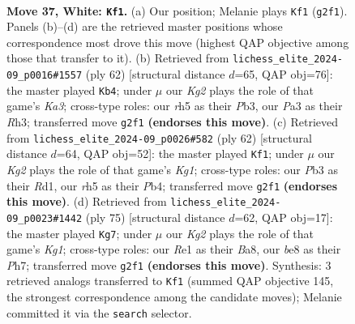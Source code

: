 \documentclass[11pt]{article}
\begin{document}
\begin{figure}[p]\centering
\begin{subfigure}{0.46\textwidth}\centering
\resizebox{\linewidth}{!}{%
\newchessgame
\chessboard[
  setfen={r3b1k1/p4pP1/8/p6r/4p1q1/PP6/1Q3PK1/3RR3 w - - 4 37},
  showmover=false,
  pgfstyle=straightmove, color=movearrow, markmove={g2-f1}
]}
\caption{}
\end{subfigure}\hfill
\begin{subfigure}{0.46\textwidth}\centering
\resizebox{\linewidth}{!}{%
\newchessgame
\chessboard[
  setfen={4r2k/5ppp/p7/3RpPb1/4Q3/KP5R/2P4P/q7 w - - 1 32},
  showmover=false,
  pgfstyle=straightmove, color=movearrow, markmove={a3-b4}
]}
\caption{}
\end{subfigure}
\\[4pt]
\begin{subfigure}{0.46\textwidth}\centering
\resizebox{\linewidth}{!}{%
\newchessgame
\chessboard[
  setfen={2r3k1/2P2pb1/p6p/6p1/1P4q1/P3B3/2Q2P2/3R2K1 w - - 1 32},
  showmover=false,
  pgfstyle=straightmove, color=movearrow, markmove={g1-f1}
]}
\caption{}
\end{subfigure}\hfill
\begin{subfigure}{0.46\textwidth}\centering
\resizebox{\linewidth}{!}{%
\newchessgame
\chessboard[
  setfen={br4k1/7p/p2q1pp1/2pP4/7P/2Q3P1/P2R1PB1/6K1 b - - 0 38},
  showmover=false,
  pgfstyle=straightmove, color=movearrow, markmove={g8-g7}
]}
\caption{}
\end{subfigure}
\caption{\textbf{Move 37, White: \texttt{Kf1}.} (a) Our position; Melanie plays \texttt{Kf1} (\texttt{g2f1}). Panels (b)--(d) are the retrieved master positions whose correspondence most drove this move (highest QAP objective among those that transfer to it). (b) Retrieved from \texttt{lichess\_elite\_2024-09\_p0016\#1557} (ply 62) [structural distance $d$=65, QAP obj=76]: the master played \texttt{Kb4}; under $\mu$ our \emph{Kg2} plays the role of that game's \emph{Ka3}; cross-type roles: our \emph{r}h5 as their \emph{P}b3, our \emph{P}a3 as their \emph{R}h3; transferred move \texttt{g2f1} \textbf{(endorses this move)}. (c) Retrieved from \texttt{lichess\_elite\_2024-09\_p0026\#582} (ply 62) [structural distance $d$=64, QAP obj=52]: the master played \texttt{Kf1}; under $\mu$ our \emph{Kg2} plays the role of that game's \emph{Kg1}; cross-type roles: our \emph{P}b3 as their \emph{R}d1, our \emph{r}h5 as their \emph{P}b4; transferred move \texttt{g2f1} \textbf{(endorses this move)}. (d) Retrieved from \texttt{lichess\_elite\_2024-09\_p0023\#1442} (ply 75) [structural distance $d$=62, QAP obj=17]: the master played \texttt{Kg7}; under $\mu$ our \emph{Kg2} plays the role of that game's \emph{Kg1}; cross-type roles: our \emph{R}e1 as their \emph{B}a8, our \emph{b}e8 as their \emph{P}h7; transferred move \texttt{g2f1} \textbf{(endorses this move)}. Synthesis: 3 retrieved analogs transferred to \texttt{Kf1} (summed QAP objective 145, the strongest correspondence among the candidate moves); Melanie committed it via the \texttt{search} selector.}
\label{fig:thought-m72}
\end{figure}
\end{document}
